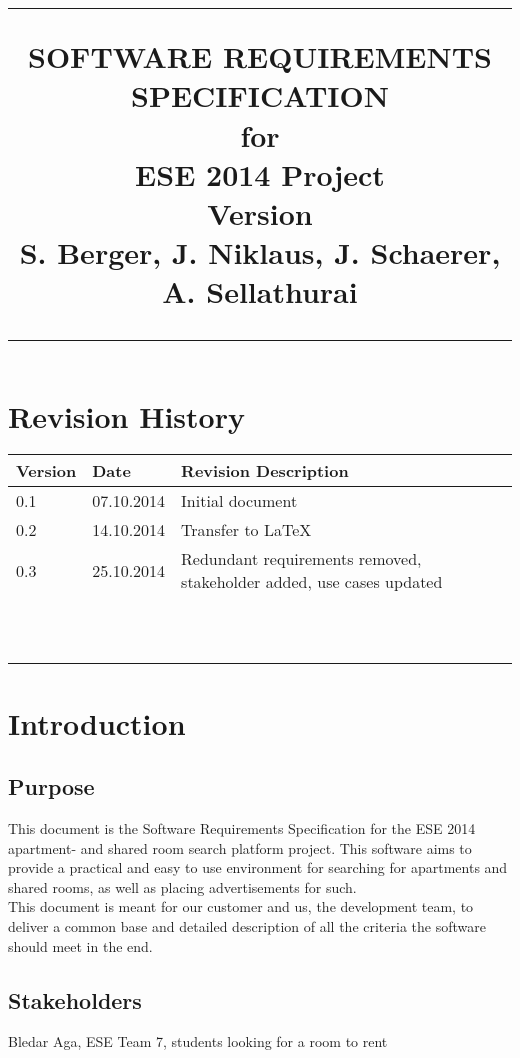\documentclass{scrreprt}
\title{%
\flushright
\rule{16cm}{5pt}\vskip1cm
\Huge{SOFTWARE REQUIREMENTS\\ SPECIFICATION}\\
\vspace{2cm}
for\\
\vspace{2cm}
ESE 2014 Project\\
\vspace{2cm}
\LARGE{Version \myversion \\}
\vspace{2cm}
S. Berger, J. Niklaus, J. Schaerer, A. Sellathurai \\
\vfill
\rule{16cm}{5pt}
}
\date{}
\begin{document}
\maketitle
\tableofcontents
\chapter*{Revision History}

\begin{tabular}{|l|l| p{10cm}|}
\hline 
\textbf{Version} & \textbf{Date} & \textbf{Revision Description} \\ 
\hline 
0.1 & 07.10.2014 & Initial document \\ 
\hline 
0.2 & 14.10.2014 & Transfer to LaTeX  \\ 
\hline 
0.3 & 25.10.2014 &  Redundant requirements removed, stakeholder added, use cases updated\\ 
\hline 
&   & \\ 
\hline 
&  &  \\ 
\hline 
&   & \\ 
\hline 
&  &  \\ 
\hline 
&   & \\ 
\hline 
&  &  \\ 
\hline 
&   & \\ 
\hline 
&  &  \\ 
\hline 
&   & \\ 
\hline 
&  &  \\ 
\hline 
&   & \\ 
\hline 
\end{tabular} 


\chapter{Introduction}
\section{Purpose}
This document is the Software Requirements Specification for the ESE 2014 apartment- and shared room search platform project. This software aims to provide a practical and easy to use environment for searching for apartments and shared rooms, as well as placing advertisements for such. \\
This document is meant for our customer and us, the development team, to deliver a common base and detailed description of all the criteria the software should meet in the end. 
\section{Stakeholders}
Bledar Aga, ESE Team 7, students looking for a room to rent
\end{document}
